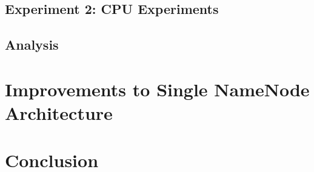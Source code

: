 \documentclass[11pt, a4paper]{article}
\begin{document}
\begin{multicols*}{2}

\subsection{Experiment 2: CPU Experiments}


\subsection{Analysis}




\section{Improvements to Single NameNode Architecture}




% 

\section{Conclusion}





\end{multicols*}
\end{document}
